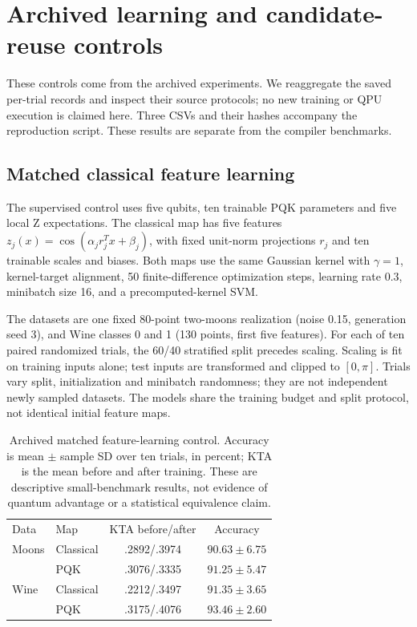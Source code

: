 \section{Archived learning and candidate-reuse controls}
\label{app:legacy_controls}
These controls come from the archived experiments.
We reaggregate the saved per-trial records and inspect their source
protocols; no new training or QPU execution is claimed here. Three
CSVs and their hashes accompany the reproduction script. These results
are separate from the compiler benchmarks.

\subsection{Matched classical feature learning}
The supervised control uses five qubits, ten trainable PQK parameters
and five local Z expectations. The classical map has five features
$z_j(x)=\cos(\alpha_j r_j^Tx+\beta_j)$, with fixed unit-norm
projections $r_j$ and ten trainable scales and biases. Both maps use
the same Gaussian kernel with $\gamma=1$, kernel-target alignment,
50 finite-difference optimization steps, learning rate 0.3,
minibatch size 16, and a precomputed-kernel SVM.

The datasets are one fixed 80-point two-moons realization (noise 0.15,
generation seed 3), and Wine classes 0 and 1 (130 points, first five
features). For each of ten paired randomized trials, the 60/40
stratified split precedes scaling. Scaling is fit on training inputs
alone; test inputs are transformed and clipped to $[0,\pi]$.
Trials vary split, initialization and minibatch randomness; they are
not independent newly sampled datasets. The models share the training
budget and split protocol, not identical initial feature maps.

\begin{table}[tb]
\caption{Archived matched feature-learning control. Accuracy is mean
$\pm$ sample SD over ten trials, in percent; KTA is the mean before
and after training. These are descriptive small-benchmark results,
not evidence of quantum advantage or a statistical equivalence claim.}
\label{tab:legacy_classical}
\begin{tabular}{llcc}
\toprule
Data & Map & KTA before/after & Accuracy\\
Moons & Classical & .2892/.3974 & $90.63\pm6.75$\\
      & PQK       & .3076/.3335 & $91.25\pm5.47$\\
Wine  & Classical & .2212/.3497 & $91.35\pm3.65$\\
      & PQK       & .3175/.4076 & $93.46\pm2.60$\\
\bottomrule
\end{tabular}
\end{table}

